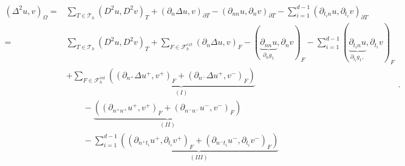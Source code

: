 \begin{equation*}
    \begin{split}
 ( \Delta  ^{2} u,v ) _{\Omega }  =&\sum_{T\in \mathcal{T} _{h}}^{} ( D^2u,D^2v ) _{T }  + (\partial _{n} \Delta  u,v)_{\partial T} - (\partial _{nn} u, \partial _{n}v )_{\partial T}  - \sum_{i=1}^{d-1} ( \partial _{t_{i}n}u , \partial _{t_{i}} v  )_{\partial T}   \\
= &\sum_{T\in \mathcal{T} _{h}}^{} ( D^2u,D^2v ) _{T }  + \sum_{F \in \mathcal{F}_{h}^{ext} }^{}  (\partial _{n} \Delta  u,v)_{F} - (\underbrace{\partial _{nn} u}_{ \partial _{n} g_{1}} , \partial _{n}v )_{F}  - \sum_{i=1}^{d-1} ( \underbrace{\partial _{ t_{i}n} u }_{  \partial_{ t_{i} } g_{1},  }, \partial _{t_{i}} v
)_{F}     \\
   &  + \sum_{F \in \mathcal{F} _{h}^{int}}^{} \underbrace{\left( (\partial _{n^{+}} \Delta  u^{+}
        ,v^{+} )_{F}
+ \left(\partial _{n^{-}} \Delta  u^{+} ,v^{-}\right)_{F}  \right)}_{(I)}    \\
    &\quad \quad  -
\underbrace{\left( \left(\partial _{n^{+}n^{+}} u^{+}, v^{+} \right) _{F} + \left(\partial _{n^{-}n^{-}} u^{-}, v^{-}
\right) _{F} \right) }_{(II)} \\
   &  \quad \quad - \sum_{i=1}^{d-1}\underbrace{( (\partial _{n^{+}t_{i}} u^{+}, \partial_{t_{i}} v^{+} )_{F} +  \left(\partial _{n^{-}t_{i}} u^{-},
        \partial_{t_{i}} v^{-}
\right)_{F} ) }_{(III)} \\
    \end{split}
.\end{equation*}

